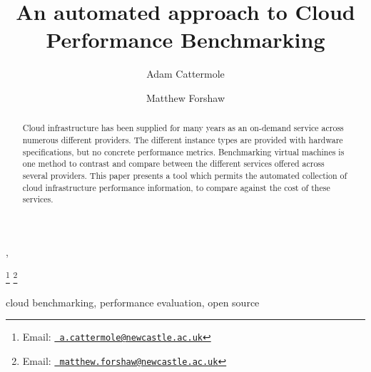 \documentclass{entcs} \usepackage{entcsmacro}
\begin{document}
%
\begin{frontmatter}
  \title{An automated approach to Cloud Performance Benchmarking} \author{Adam Cattermole},
  \author{Matthew Forshaw}
  \address{School of Computing\\Newcastle University\\
    Newcastle upon Tyne, United Kingdom} \thanks[myemail]{Email:
    \href{mailto:a.cattermole@newcastle.ac.uk} {\texttt{\normalshape
        a.cattermole@newcastle.ac.uk}}} \thanks[coemail]{Email:
    \href{mailto:matthew.forshaw@newcastle.ac.uk} {\texttt{\normalshape
        matthew.forshaw@newcastle.ac.uk}}}


%
%
%
%
%


\begin{abstract}
Cloud infrastructure has been supplied for many years as an on-demand service across numerous different providers. The different instance types are provided with hardware specifications, but no concrete performance metrics. Benchmarking virtual machines is one method to contrast and compare between the different services offered across several providers. %
This paper presents a tool which permits the automated collection of cloud infrastructure performance information, to compare against the cost of these services.
\end{abstract}
\begin{keyword}
  cloud benchmarking, performance evaluation, open source
\end{keyword}
%
\end{frontmatter}
\end{document}
